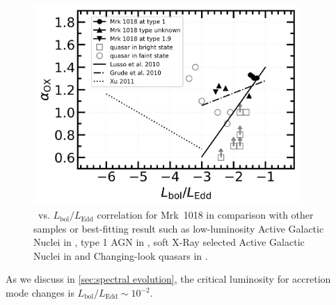 \begin{figure}
\centering
	\includegraphics[width=0.9\textwidth]{./pic/Mrk1018_subplots_plus_alpha_ox_logLbol_rate.png}
    \caption{\alphaox\, vs. $L_\mathrm{bol}/L_\mathrm{Edd}$ correlation for Mrk~1018 in comparison with other samples or best-fitting result such as low-luminosity Active Galactic Nuclei in \citet[][]{2011ApJ...739...64X}, type 1 AGN in \citet{2010A&A...512A..34L}, soft X-Ray selected Active Galactic Nuclei in \citet[][]{2010ApJS..187...64G} and Changing-look quasars in \citet[][]{2019ApJ...883...76R}. }
    \label{fig:alphaox-bol}
\end{figure}





As we discuss in \autoref{sec:spectral evolution}, the critical luminosity for accretion mode changes is $L_\mathrm{bol}/L_\mathrm{Edd}\sim 10^{-2}$. 










